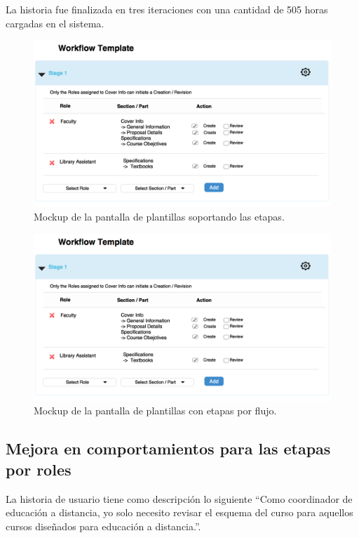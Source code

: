 La historia fue finalizada en tres iteraciones con una cantidad de 505 horas cargadas en el sistema.

\begin{figure}[H]
\centering
\includegraphics[width=125mm,scale=1]{Capitulos/DesarrollodelaAplicacion/Imagenes/workflow_stage}
\caption{Mockup de la pantalla de plantillas soportando las etapas.}
  \label{workflow_stage}
\end{figure}

\begin{figure}[H]
\centering
\includegraphics[width=125mm,scale=1]{Capitulos/DesarrollodelaAplicacion/Imagenes/workflow_stage}
\caption{Mockup de la pantalla de plantillas con etapas por flujo.}
  \label{workflow_template_stage}
\end{figure}

\subsection{Mejora en comportamientos para las etapas por roles}
La historia de usuario tiene como descripción lo siguiente \enquote{Como coordinador de educación a distancia, yo solo necesito revisar el esquema del curso para aquellos cursos diseñados para educación a distancia.}.

